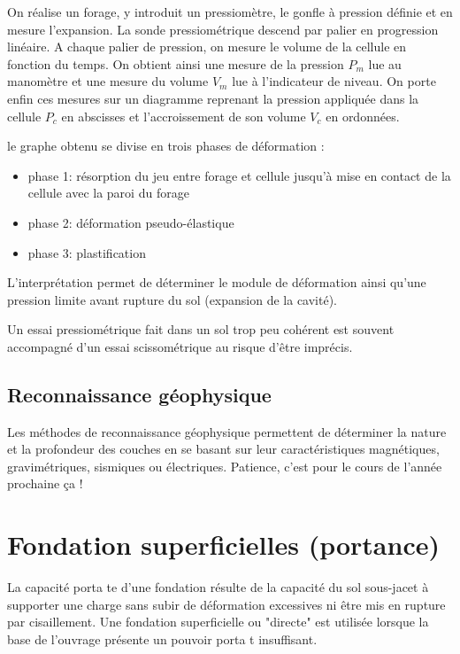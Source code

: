             On réalise un forage, y introduit un pressiomètre, le gonfle à pression définie et en mesure l'expansion. La sonde pressiométrique descend par palier en progression linéaire. A chaque palier de pression, on mesure le volume de la cellule en fonction du temps. On obtient ainsi une mesure de la pression $P_m$ lue au manomètre et une mesure du volume $V_m$ lue à l'indicateur de niveau. On porte enfin ces mesures sur un diagramme reprenant la pression appliquée dans la cellule $P_c$ en abscisses et l'accroissement de son volume $V_c$ en ordonnées.
            
            le graphe obtenu se divise en trois phases de déformation : %
            \begin{itemize}
                \item phase 1: résorption du jeu entre forage et cellule jusqu'à mise en contact de la cellule avec la paroi du forage
                \item phase 2: déformation pseudo-élastique
                \item phase 3: plastification
            \end{itemize} 
            
            L'interprétation permet de déterminer le module de déformation ainsi qu'une pression limite avant rupture du sol (expansion de la cavité). 
            
            Un essai pressiométrique fait dans un sol trop peu cohérent est souvent accompagné d'un essai scissométrique au risque d'être imprécis.
            
    \subsection{Reconnaissance géophysique}
    
    Les méthodes de reconnaissance géophysique permettent de déterminer la nature et la profondeur des couches en se basant sur leur caractéristiques magnétiques, gravimétriques, sismiques ou électriques. 
        Patience, c'est pour le cours de l'année prochaine ça !
        
\section{Fondation superficielles (portance)}
    
    La capacité porta te d'une fondation résulte de la capacité du sol sous-jacet à supporter une charge sans subir de déformation excessives ni être mis en rupture par cisaillement. Une fondation superficielle ou "directe" est utilisée lorsque la base de l'ouvrage présente un pouvoir porta t insuffisant.
    
